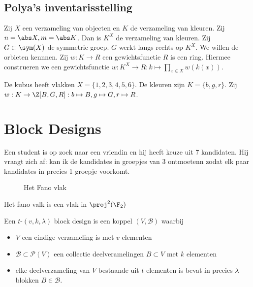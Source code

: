 \section{Polya's inventarisstelling} \label{sec:polya's_inventarisstelling}
Zij $X$ een verzameling van objecten en $K$ de verzameling van kleuren. Zij $n = \abs X, m = \abs K$. 
Dan is $K^{X}$ de verzameling van kleuren. Zij  $G \subset \sym (X)$  de symmetrie groep. $G$ werkt langs rechts op $K^{X}$. 
We willen de orbieten kennnen.
Zij $w: K \to R$ een gewichtsfunctie $R$ is een ring.
Hiermee construeren we een gewichtsfunctie $w: K^{X}\to R: k\mapsto \prod_{x \in X}w(k(x))$.

\begin{voorbeeld}
	De kubus heeft vlakken $X = \{1, 2, 3, 4, 5, 6\} $. De kleuren zijn  $K = \{b, g, r\} $. Zij $w: K \to \Z[B,G,R]: b\mapsto B, g\mapsto G, r\mapsto R$.
\end{voorbeeld}

\chapter{Block Designs} \label{chap:block_designs}

\begin{vb}
	Een student is op zoek naar een vriendin en hij heeft keuze uit 7 kandidaten. 
	Hij vraagt zich af: kan ik de kandidates in groepjes van 3 ontmoetenn zodat elk paar kandidates in precies 1 groepje voorkomt.
\end{vb}
\begin{figure}[ht]
    \centering
    \caption{Het Fano vlak}
    \label{fig:het-fano-vlak}
\end{figure}
Het fano valk is een vlak in $\proj^2(\F_2)$

\begin{definitie}
	Een $t$-$(v, k, \lambda)$ block design is een koppel $(V, \mathcal{B} )$ waarbij 	\begin{itemize}
		\item $V$ een eindige verzameling is met $v$ elementen
		\item $\mathcal{B} \subset  \mathcal{P} (V)$ een collectie deelveramelingen $B \subset V$ met $k$ elementen
		\item elke deelverzameling van  $V$ bestaande uit $t$ elementen is bevat in precies $\lambda$ blokken $B \in \mathcal{B} $.
	\end{itemize}
\end{definitie}

